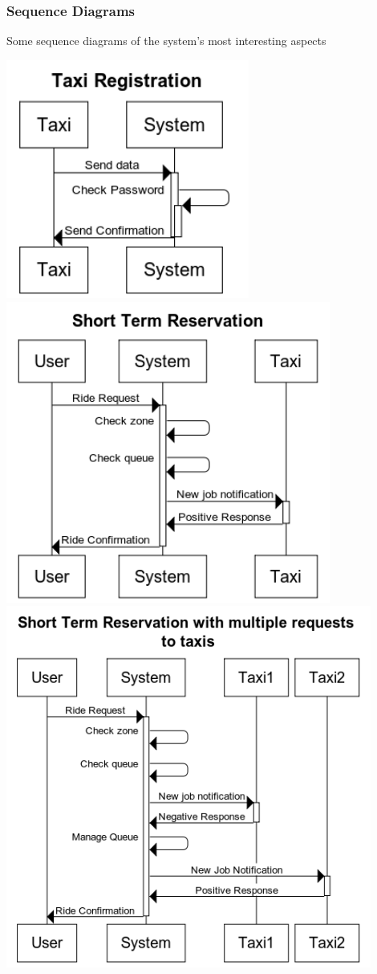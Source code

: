 \subsubsection{Sequence Diagrams}
	Some sequence diagrams of the system's most interesting aspects
	\begin{center}
		\includegraphics[width=0.60\textwidth]{./images/Taxi_Registration}
		\newpage
		\includegraphics[width=0.80\textwidth]{./images/Short_Term_Reservation}
		\newpage
		\includegraphics[width=0.90\textwidth]{./images/Short_Term_Reservation_with_multiple_requests_to_taxis}

\end{center}
